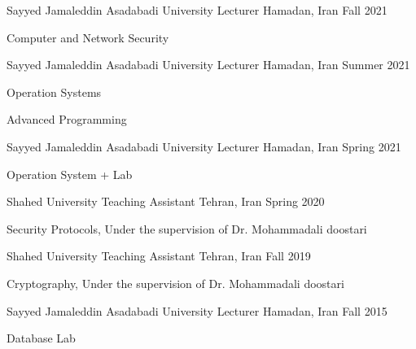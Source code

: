 

\begin{cventries}

  \cventry
    {Sayyed Jamaleddin Asadabadi University} 
    {Lecturer}
    {Hamadan, Iran} 
    {Fall 2021} 
    {
      \begin{cvitems} 
        \item {Computer and Network Security}
      \end{cvitems}
    }

  \cventry
    {Sayyed Jamaleddin Asadabadi University} 
    {Lecturer}
    {Hamadan, Iran} 
    {Summer 2021} 
    {
      \begin{cvitems} 
        \item {Operation Systems}
        \item {Advanced Programming}
      \end{cvitems}
    }

  \cventry
    {Sayyed Jamaleddin Asadabadi University} 
    {Lecturer}
    {Hamadan, Iran} 
    {Spring 2021} 
    {
      \begin{cvitems} 
        \item {Operation System + Lab}
      \end{cvitems}
    }

  \cventry
    {Shahed University}
    {Teaching Assistant}
    {Tehran, Iran}
    {Spring 2020}
    {
      \begin{cvitems} 
        \item {Security Protocols, Under the supervision of Dr. Mohammadali doostari}
      \end{cvitems}
    }

  \cventry
    {Shahed University}
    {Teaching Assistant}
    {Tehran, Iran}
    {Fall 2019}
    {
      \begin{cvitems} 
        \item {Cryptography, Under the supervision of Dr. Mohammadali doostari}
      \end{cvitems}
    }

  \cventry
    {Sayyed Jamaleddin Asadabadi University} 
    {Lecturer}
    {Hamadan, Iran} 
    {Fall 2015} 
    {
      \begin{cvitems} 
        \item {Database Lab}
      \end{cvitems}
    }


\end{cventries}
